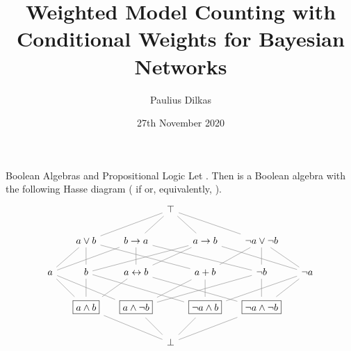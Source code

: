 \documentclass{beamer}
\author{Paulius Dilkas}
\title{Weighted Model Counting with Conditional Weights for Bayesian Networks}
\date{27th November 2020}
\begin{document}
\frame{\titlepage}

\begin{frame}{Boolean Algebras and Propositional Logic}
  Let . Then  is a Boolean
  algebra with the following Hasse diagram ( if
   or, equivalently, ).
  \[
    \begin{tikzcd}[ampersand replacement=\&, column sep=tiny]
      \& \& \& \& \& \top \ar[dlll,dash,gray] \ar[dl,dash,gray]
      \ar[dr,dash,gray] \ar[drrr,dash,gray] \& \& \& \\
      \& \& a \lor b \& \& b \to a \& \& a \to b \& \& \neg a \lor \neg
      b \\
      a \ar[urr,dash,gray] \ar[urrrr,dash,gray] \& \& b \ar[u,dash,gray]
      \ar[urrrr,dash,gray] \& \& a \leftrightarrow b \ar[u,dash,gray]
      \ar[urr,dash,gray] \& \& a + b \ar[ullll,dash,gray] \ar[urr,dash,gray]
      \& \& \neg b \ar[ullll,dash,gray] \ar[u,dash,gray] \& \& \neg a
      \ar[ullll,dash,gray] \ar[ull,dash,gray] \\
      \& \& \fbox{$a \land b$} \ar[ull,dash,gray] \ar[u,dash,gray]
      \ar[urr,dash,gray] \& \& \fbox{$a \land \neg b$} \ar[ullll,dash,gray]
      \ar[urr,dash,gray] \ar[urrrr,dash,gray] \& \& \fbox{$\neg a \land b$}
      \ar[ullll,dash,gray] \ar[u,dash,gray] \ar[urrrr,dash,gray] \& \&
      \fbox{$\neg a \land \neg b$} \ar[ullll,dash,gray] \ar[u,dash,gray]
      \ar[urr,dash,gray] \\
      \& \& \& \& \& \bot \ar[ulll,dash,gray] \ar[ul,dash,gray]
      \ar[ur,dash,gray] \ar[urrr,dash,gray] \& \& \&
    \end{tikzcd}
  \]
\end{frame}
\end{document}
